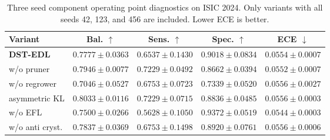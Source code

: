\documentclass[letterpaper]{article}
\begin{document}
\begin{table}[!t]
\centering
\caption{Three seed component operating point diagnostics on ISIC 2024. Only variants with all seeds 42, 123, and 456 are included. Lower ECE is better.}
\label{tab:ablation_components_full}
\scriptsize
\renewcommand{\arraystretch}{1.05}
\setlength{\tabcolsep}{1.8pt}
\begin{adjustbox}{max width=\columnwidth}
\begin{tabular}{@{}l C C C C@{}}
\toprule
\textbf{Variant} & \textbf{Bal.} $\uparrow$ & \textbf{Sens.} $\uparrow$ & \textbf{Spec.} $\uparrow$ & \textbf{ECE} $\downarrow$ \\
\midrule
\textbf{DST-EDL} & $0.7777\pm0.0363$ & $0.6537\pm0.1430$ & $0.9018\pm0.0834$ & $0.0554\pm0.0007$ \\
w/o pruner & $0.7946\pm0.0077$ & $0.7229\pm0.0492$ & $0.8662\pm0.0394$ & $0.0552\pm0.0007$ \\
w/o regrower & $0.7046\pm0.0527$ & $0.6753\pm0.0723$ & $0.7339\pm0.0520$ & $0.0556\pm0.0027$ \\
asymmetric KL & $\mathbf{0.8033\pm0.0116}$ & $\mathbf{0.7229\pm0.0715}$ & $0.8836\pm0.0485$ & $0.0556\pm0.0003$ \\
w/o EFL & $0.7500\pm0.0266$ & $0.5628\pm0.1050$ & $\mathbf{0.9372\pm0.0519}$ & $\mathbf{0.0544\pm0.0003}$ \\
w/o anti cryst. & $0.7837\pm0.0369$ & $0.6753\pm0.1498$ & $0.8920\pm0.0761$ & $0.0556\pm0.0006$ \\
\bottomrule
\end{tabular}
\end{adjustbox}
\end{table}
\end{document}
